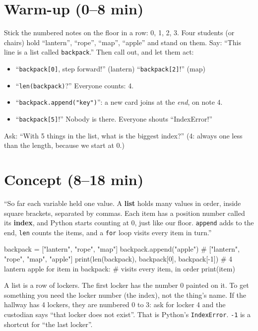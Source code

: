 \section{Warm-up (0--8 min)}
\begin{unplugged}
Stick the numbered notes on the floor in a row: 0, 1, 2, 3. Four students (or chairs) hold \enquote{lantern}, \enquote{rope}, \enquote{map}, \enquote{apple}
and stand on them. Say: \enquote{This line is a list called \texttt{backpack}.} Then call out, and let them act:
\begin{itemize}[leftmargin=1.2em]
  \item \enquote{\texttt{backpack[0]}, step forward!} (lantern) \quad \enquote{\texttt{backpack[2]}!} (map)
  \item \enquote{\texttt{len(backpack)}?} Everyone counts: 4.
  \item \enquote{\texttt{backpack.append("key")}}: a new card joins at the \emph{end}, on note 4.
  \item \enquote{\texttt{backpack[5]}!} Nobody is there. Everyone shouts \enquote{IndexError!}
\end{itemize}
Ask: \enquote{With 5 things in the list, what is the biggest index?} (4: always one less than the length, because we start at 0.)
\end{unplugged}

\section{Concept (8--18 min)}
\begin{teacherscript}[Say]
\enquote{So far each variable held one value. A \textbf{list} holds many values in order, inside square brackets, separated by commas.
Each item has a position number called its \textbf{index}, and Python starts counting at 0, just like our floor.
\texttt{append} adds to the end, \texttt{len} counts the items, and a \texttt{for} loop visits every item in turn.}
\end{teacherscript}

\begin{pycode}
backpack = ["lantern", "rope", "map"]
backpack.append("apple")            # ["lantern", "rope", "map", "apple"]
print(len(backpack), backpack[0], backpack[-1])   # 4 lantern apple
for item in backpack:               # visits every item, in order
    print(item)
\end{pycode}

\begin{analogy}
A list is a row of lockers. The first locker has the number 0 painted on it. To get something you need the locker number (the index),
not the thing's name. If the hallway has 4 lockers, they are numbered 0 to 3: ask for locker 4 and the custodian says
\enquote{that locker does not exist}. That is Python's \texttt{IndexError}. \texttt{-1} is a shortcut for \enquote{the last locker}.
\end{analogy}

